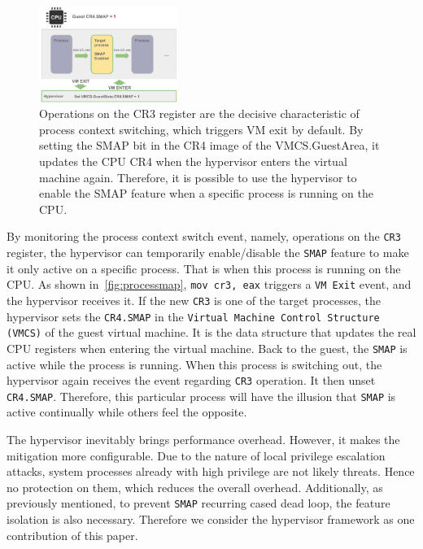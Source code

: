 \begin{figure}[th]
  \includegraphics[width=0.40\textwidth]{figures/processmap3}
  \centering
  \caption{Operations on the CR3 register are the decisive characteristic of process context switching, which triggers VM exit by default. By setting the SMAP bit in the CR4 image of the VMCS.GuestArea, it updates the CPU CR4 when the hypervisor enters the virtual machine again. Therefore, it is possible to use the hypervisor to enable the SMAP feature when a specific process is running on the CPU.}
  \label{fig:processmap}
\end{figure}


By monitoring the process context switch event, namely, operations on the \texttt{CR3} register, the hypervisor can temporarily enable/disable the \texttt{SMAP} feature to make it only active on a specific process. That is when this process is running on the CPU. As shown in~\autoref{fig:processmap}, \texttt{mov cr3, eax} triggers a \texttt{VM Exit} event, and the hypervisor receives it. If the new \texttt{CR3} is one of the target processes, the hypervisor sets the \texttt{CR4.SMAP} in the \texttt{Virtual Machine Control Structure (VMCS)} of the guest virtual machine. It is the data structure that updates the real CPU registers when entering the virtual machine. Back to the guest, the \texttt{SMAP} is active while the process is running. When this process is switching out, the hypervisor again receives the event regarding \texttt{CR3} operation. It then unset \texttt{CR4.SMAP}. Therefore, this particular process will have the illusion that \texttt{SMAP} is active continually while others feel the opposite.

The hypervisor inevitably brings performance overhead. However, it makes the mitigation more configurable. Due to the nature of local privilege escalation attacks, system processes already with high privilege are not likely threats. Hence no protection on them, which reduces the overall overhead.  Additionally, as previously mentioned, to prevent \texttt{SMAP} recurring cased dead loop, the feature isolation is also necessary. Therefore we consider the hypervisor framework as one contribution of this paper.

